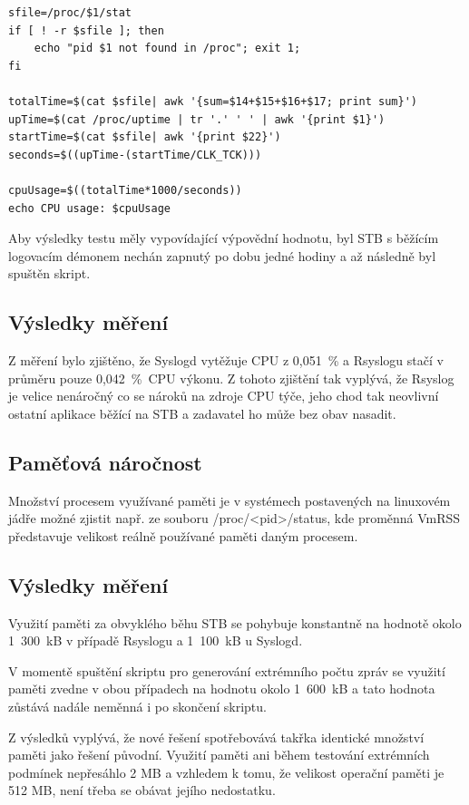 \documentclass[thesis=B,czech]{FITthesis}[2012/06/26]
\begin{document}
\begin{lstlisting}[style=AshStyle]
sfile=/proc/$1/stat
if [ ! -r $sfile ]; then
    echo "pid $1 not found in /proc"; exit 1;
fi

totalTime=$(cat $sfile| awk '{sum=$14+$15+$16+$17; print sum}')
upTime=$(cat /proc/uptime | tr '.' ' ' | awk '{print $1}')
startTime=$(cat $sfile| awk '{print $22}')
seconds=$((upTime-(startTime/CLK_TCK)))

cpuUsage=$((totalTime*1000/seconds))
echo CPU usage: $cpuUsage
\end{lstlisting}
Aby výsledky testu měly vypovídající výpovědní hodnotu, byl STB s běžícím logovacím démonem nechán zapnutý po dobu jedné hodiny a až následně byl spuštěn skript.

\subsection*{Výsledky měření}
Z měření bylo zjištěno, že Syslogd vytěžuje CPU z 0,051~\% a Rsyslogu stačí v průměru pouze 0,042~\%~CPU výkonu. Z tohoto zjištění tak vyplývá, že Rsyslog je velice nenáročný co se nároků na zdroje CPU týče, jeho chod tak neovlivní ostatní aplikace běžící na STB a zadavatel ho může bez obav nasadit.

\subsection{Paměťová náročnost}
Množství procesem využívané paměti je v systémech postavených na linuxovém jádře možné zjistit např. ze souboru /proc/<pid>/status, kde proměnná VmRSS představuje velikost reálně používané paměti daným procesem.

\subsection*{Výsledky měření}
Využití paměti za obvyklého běhu STB se pohybuje konstantně na hodnotě okolo 1~300~kB v případě Rsyslogu a 1~100~kB u Syslogd.

V momentě spuštění skriptu pro generování extrémního počtu zpráv se využití paměti zvedne v obou případech na hodnotu okolo 1~600~kB a tato hodnota zůstává nadále neměnná i po skončení skriptu.

Z výsledků vyplývá, že nové řešení spotřebovává takřka identické množství paměti jako řešení původní. Využití paměti ani během testování extrémních podmínek nepřesáhlo 2 MB a vzhledem k tomu, že velikost operační paměti je 512 MB, není třeba se obávat jejího nedostatku.
\end{document}
